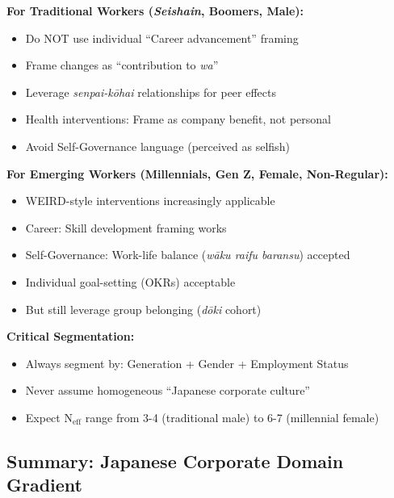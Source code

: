 \begin{tcolorbox}[colback=blue!5!white, colframe=blue!75!black, title=Practitioner Guidance: Japanese Corporate Context]

\textbf{For Traditional Workers (\textit{Seishain}, Boomers, Male):}
\begin{itemize}[nosep]
\item Do NOT use individual ``Career advancement'' framing
\item Frame changes as ``contribution to \textit{wa}''
\item Leverage \textit{senpai-kōhai} relationships for peer effects
\item Health interventions: Frame as company benefit, not personal
\item Avoid Self-Governance language (perceived as selfish)
\end{itemize}

\textbf{For Emerging Workers (Millennials, Gen Z, Female, Non-Regular):}
\begin{itemize}[nosep]
\item WEIRD-style interventions increasingly applicable
\item Career: Skill development framing works
\item Self-Governance: Work-life balance (\textit{wāku raifu baransu}) accepted
\item Individual goal-setting (OKRs) acceptable
\item But still leverage group belonging (\textit{dōki} cohort)
\end{itemize}

\textbf{Critical Segmentation:}
\begin{itemize}[nosep]
\item Always segment by: Generation + Gender + Employment Status
\item Never assume homogeneous ``Japanese corporate culture''
\item Expect N$_{\text{eff}}$ range from 3-4 (traditional male) to 6-7 (millennial female)
\end{itemize}

\end{tcolorbox}

\subsection{Summary: Japanese Corporate Domain Gradient}

